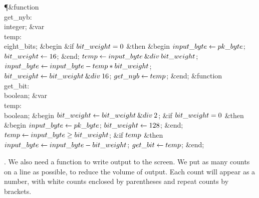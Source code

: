 \Y\P\4\&{function}\1\  \\{get\_nyb}: \\{integer};\6
\4\&{var} \\{temp}: \\{eight\_bits};\2\6
\&{begin} \&{if} $\\{bit\_weight}=0$ \1\&{then}\6
\&{begin} $\\{input\_byte}\gets\\{pk\_byte}$;\5
$\\{bit\_weight}\gets16$;\6
\&{end};\2\6
$\\{temp}\gets\\{input\_byte}\mathbin{\&{div}}\\{bit\_weight}$;\5
$\\{input\_byte}\gets\\{input\_byte}-\\{temp}\ast\\{bit\_weight}$;\5
$\\{bit\_weight}\gets\\{bit\_weight}\mathbin{\&{div}}16$;\5
$\\{get\_nyb}\gets\\{temp}$;\6
\&{end};\7
\4\&{function}\1\  \\{get\_bit}: \\{boolean};\6
\4\&{var} \\{temp}: \\{boolean};\2\6
\&{begin} $\\{bit\_weight}\gets\\{bit\_weight}\mathbin{\&{div}}2$;\6
\&{if} $\\{bit\_weight}=0$ \1\&{then}\6
\&{begin} $\\{input\_byte}\gets\\{pk\_byte}$;\5
$\\{bit\_weight}\gets128$;\6
\&{end};\2\6
$\\{temp}\gets\\{input\_byte}\ge\\{bit\_weight}$;\6
\&{if} $\\{temp}$ \1\&{then}\5
$\\{input\_byte}\gets\\{input\_byte}-\\{bit\_weight}$;\2\6
$\\{get\_bit}\gets\\{temp}$;\6
\&{end};\par
\fi

. We also need a function to write output to the screen.  We put as many
counts on a line as possible, to reduce the volume of output.  Each count
will appear as a number, with white counts enclosed by parentheses and repeat
counts by brackets.

